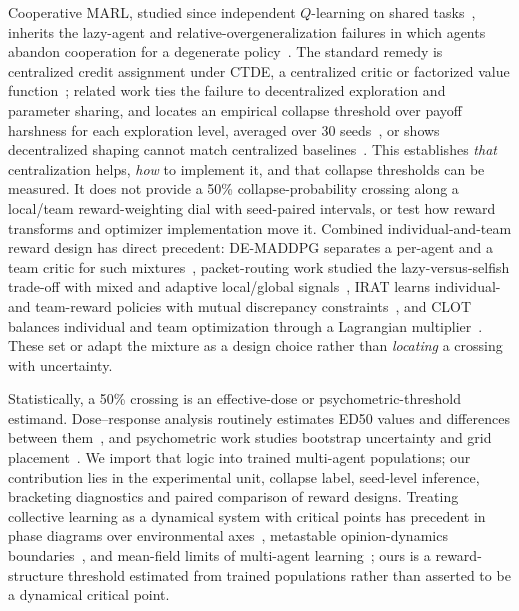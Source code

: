 Cooperative MARL, studied since independent $Q$-learning on shared
tasks~\citep{tan1993multi,busoniu2008comprehensive}, inherits the lazy-agent and
relative-overgeneralization failures in which agents abandon cooperation for a degenerate
policy~\citep{liu2023lazy,peng2023curo,tampuu2017multiagent}. The standard remedy is centralized
credit assignment under CTDE, a centralized critic or factorized value
function~\citep{lowe2017multi,yu2022surprising,sunehag2018vdn,rashid2018qmix,foerster2018counterfactual,son2019qtran};
related work ties the failure to decentralized exploration and parameter sharing, and locates an
empirical collapse threshold over payoff harshness for each exploration level, averaged over 30
seeds~\citep{weng2026}, or shows decentralized shaping cannot match centralized
baselines~\citep{dmarl2025}. This establishes \emph{that} centralization helps, \emph{how} to implement
it, and that collapse thresholds can be measured. It does not provide a 50\% collapse-probability
crossing along a local/team reward-weighting dial with seed-paired intervals, or test how reward
transforms and optimizer implementation move it. Combined
individual-and-team reward design has direct precedent: DE-MADDPG separates a per-agent and a team
critic for such mixtures~\citep{demaddpg2020}, packet-routing work studied the lazy-versus-selfish
trade-off with mixed and adaptive local/global signals~\citep{mao2020reward}, IRAT
learns individual- and team-reward policies with mutual discrepancy constraints~\citep{wang2022irat},
and CLOT balances individual and team optimization through a Lagrangian
multiplier~\citep{zhang2026clot}. These set or adapt the mixture as a design choice rather than
\emph{locating} a crossing with uncertainty.

Statistically, a 50\% crossing is an effective-dose or psychometric-threshold estimand. Dose--response
analysis routinely estimates ED50 values and differences between them~\citep{ritz2015dose}, and
psychometric work studies bootstrap uncertainty and grid placement~\citep{wichmann2001psychometric}.
We import that logic into trained multi-agent populations; our contribution lies in the experimental
unit, collapse label, seed-level inference, bracketing diagnostics and paired comparison of reward
designs. Treating collective learning as a dynamical system with critical points has precedent in
phase diagrams over environmental axes~\citep{yamaguchi2025}, metastable opinion-dynamics
boundaries~\citep{capannoli2026phase}, and mean-field limits of multi-agent
learning~\citep{hu2019meanfield,barfuss2019deterministic,hussain2025convergence}; ours is a
reward-structure threshold estimated from trained populations rather than asserted to be a dynamical
critical point.



